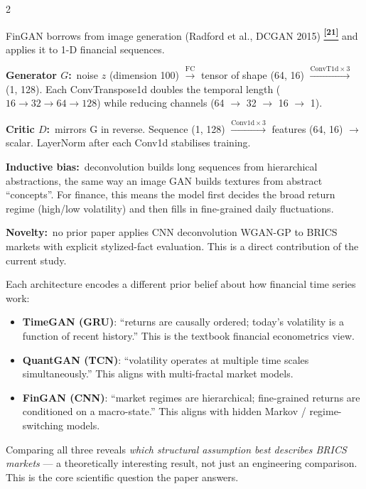 \documentclass[10pt]{article}
\newcommand{\tealbox}[2]{\begin{tcolorbox}[mybox={Teal}{LBg},title={#1}]#2\end{tcolorbox}}
\newcommand{\greenbox}[2]{\begin{tcolorbox}[mybox={FGreen}{GBg},title={#1}]#2\end{tcolorbox}}
\newcommand{\tcite}[1]{%
  \hyperlink{R:#1}{\textsuperscript{\scriptsize\textbf{[#1]}}}}
\begin{document}
\begin{multicols}{2}
\columnbreak

\tealbox{FinGAN: Generating Sequences like Images}{%
FinGAN borrows from image generation (Radford et al., DCGAN 2015)\tcite{21} and applies it to 1-D financial sequences.

\smallskip
\textbf{Generator $G$:}\ noise $z$ (dimension 100) $\xrightarrow{\text{FC}}$ tensor of shape (64, 16) $\xrightarrow{\text{ConvT1d}\times 3}$ (1, 128). Each ConvTranspose1d doubles the temporal length ($16 \to 32 \to 64 \to 128$) while reducing channels (64 $\to$ 32 $\to$ 16 $\to$ 1).

\textbf{Critic $D$:}\ mirrors G in reverse. Sequence (1, 128) $\xrightarrow{\text{Conv1d}\times 3}$ features (64, 16) $\to$ scalar. LayerNorm after each Conv1d stabilises training.

\textbf{Inductive bias:}\ deconvolution builds long sequences from hierarchical abstractions, the same way an image GAN builds textures from abstract ``concepts''. For finance, this means the model first decides the broad return regime (high/low volatility) and then fills in fine-grained daily fluctuations.

\textbf{Novelty:}\ no prior paper applies CNN deconvolution WGAN-GP to BRICS markets with explicit stylized-fact evaluation. This is a direct contribution of the current study.}

\greenbox{Why Compare All Three? The Inductive Bias Argument}{%
Each architecture encodes a different prior belief about how financial time series work:
\begin{itemize}
  \item \textbf{TimeGAN (GRU)}: ``returns are causally ordered; today's volatility is a function of recent history.'' This is the textbook financial econometrics view.
  \item \textbf{QuantGAN (TCN)}: ``volatility operates at multiple time scales simultaneously.'' This aligns with multi-fractal market models.
  \item \textbf{FinGAN (CNN)}: ``market regimes are hierarchical; fine-grained returns are conditioned on a macro-state.'' This aligns with hidden Markov / regime-switching models.
\end{itemize}
Comparing all three reveals \emph{which structural assumption best describes BRICS markets} --- a theoretically interesting result, not just an engineering comparison. This is the core scientific question the paper answers.}

\end{multicols}
\end{document}
